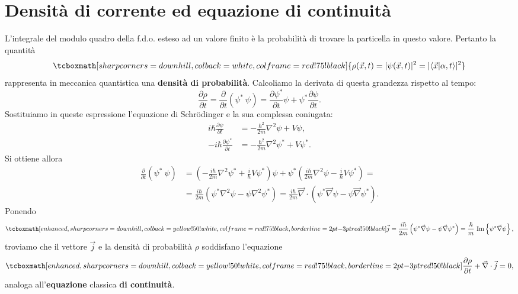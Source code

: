 \section[Densità di corrente ed equazione di continuità]{Densità di corrente ed equazione di continuità}
L'integrale del modulo quadro della f.d.o. esteso ad un valore finito è la probabilità di trovare la particella in questo valore. Pertanto la quantità
	\begin{equation}
		\tcboxmath[sharp corners=downhill, colback=white, colframe=red!75!black]{
			\rho (\vec{x}, t) = \vert \psi (\vec{x},t) \vert ^2 = \vert \langle \vec{x}\vert \alpha, t \rangle \vert ^2
				}
	\end{equation}
rappresenta in meccanica quantistica una \textbf{densità di probabilità}. Calcoliamo la derivata di questa grandezza rispetto al tempo:
	\begin{equation}
		\frac{\partial \rho}{\partial t} = \frac{\partial }{\partial t}\left( \psi^*\ \psi \right) = \frac{\partial \psi ^*}{\partial t}\psi + \psi^*\frac{\partial \psi}{\partial t}.
	\end{equation}
Sostituiamo in queste espressione l'equazione di Schr\"{o}dinger e la sua complessa coniugata:
	\begin{align}
	 	i\hbar \frac{\partial \psi}{\partial t} &= -\frac{\hbar ^2}{2m} \nabla ^ 2 \psi + V \psi ,\\[0.5cm]
		 -i\hbar \frac{\partial \psi ^*}{\partial t} &= -\frac{\hbar ^2}{2m} \nabla ^ 2 \psi ^* + V \psi ^* .
	\end{align}
Si ottiene allora
	\begin{align}
		\frac{\partial }{\partial t}\left(\psi^*\ \psi \right) & =  \left(-\frac{i\hbar}{2m}\nabla ^2 \psi ^* +\frac{i}{\hbar}V\psi ^*\right)\psi +  \psi ^* \left(\frac{i\hbar}{2m}\nabla ^2 \psi -\frac{i}{\hbar}V\psi ^*\right)= \nonumber\\[0.3cm]
		&=  \frac{i\hbar}{2m}\left(\psi ^* \nabla ^2 \psi - \psi \nabla ^2 \psi ^* \right) =  \frac{i\hbar}{2m} \vec{\nabla}\cdot \left(\psi ^* \vec{\nabla} \psi - \psi \vec{\nabla} \psi ^* \right). 
	\end{align}
Ponendo
	\begin{equation}
		\tcboxmath[enhanced, sharp corners=downhill, colback=yellow!50!white, colframe=red!75!black, borderline={2pt}{-3pt}{red!50!black}]{
			\vec{j}=\frac{i\hbar}{2m} \left(\psi ^* \vec{\nabla} \psi - \psi \vec{\nabla} \psi ^* \right)= \frac{\hbar}{m}\ \textrm{Im}\left\{\psi ^* \vec{\nabla}\psi \right\},
			}
	\end{equation}
troviamo che il vettore $\vec{j}$ e la densità di probabilità $\rho$ soddisfano l'equazione
	\begin{equation}
		\tcboxmath[enhanced, sharp corners=downhill, colback=yellow!50!white, colframe=red!75!black, borderline={2pt}{-3pt}{red!50!black}]{
			\frac{\partial \rho}{\partial t}+ \vec{\nabla}\cdot\vec{j}=0,
				}
	\end{equation}
analoga all'\textbf{equazione} classica \textbf{di continuità}.\\


